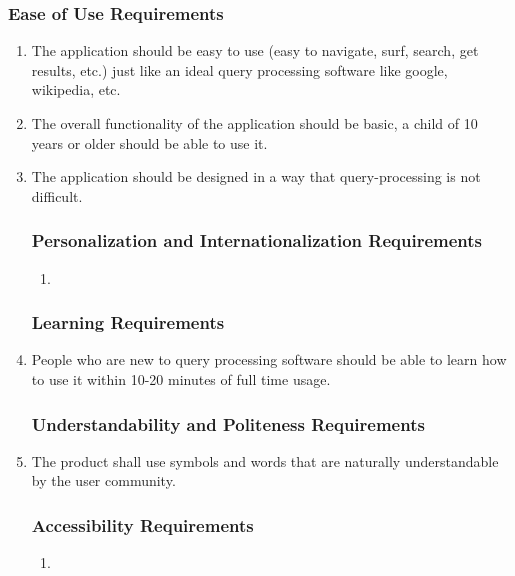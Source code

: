 \documentclass[]{article}
\begin{document}
\subsubsection{Ease of Use Requirements}
\label{ssub:ease_of_use_requirements}
\begin{enumerate}[{UH}1. ]
	\item The application should be easy to use (easy to navigate, surf, search, get results, etc.) just like an ideal query processing software like google, wikipedia, etc.
	\item The overall functionality of the application should be basic, a child of 10 years or older should be able to use it.
	\item The application should be designed in a way that query-processing is not difficult.

\subsubsection{Personalization and Internationalization Requirements}
\label{ssub:personalization_and_internationalization_requirements}
\begin{enumerate}[{N/A} ]
	\item
\end{enumerate}

\subsubsection{Learning Requirements}
\label{ssub:learning_requirements}
	\item People who are new to query processing software should be able to learn how to use it within 10-20 minutes of full time usage.
	

\subsubsection{Understandability and Politeness Requirements}
\label{ssub:understandability_and_politeness_requirements}
	\item The product shall use symbols and words that are naturally understandable by the user community.

\subsubsection{Accessibility Requirements}
\label{ssub:accessibility_requirements}
\begin{enumerate}[{N/A} ]
	\item
\end{enumerate}
\end{enumerate}
\end{document}
